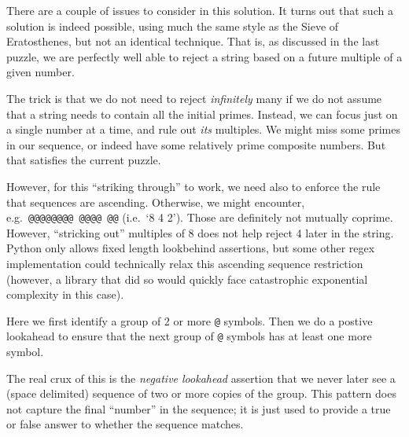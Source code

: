 \newpage

There are a couple of issues to consider in this solution. It turns out
that such a solution is indeed possible, using much the same style as
the Sieve of Eratosthenes, but not an identical technique. That is, as
discussed in the last puzzle, we are perfectly well able to reject a
string based on a future multiple of a given number.

The trick is that we do not need to reject \emph{infinitely} many if we
do not assume that a string needs to contain all the initial primes.
Instead, we can focus just on a single number at a time, and rule out
\emph{its} multiples. We might miss some primes in our sequence, or
indeed have some relatively prime composite numbers. But that satisfies
the current puzzle.

However, for this ``striking through'' to work, we need also to enforce
the rule that sequences are ascending. Otherwise, we might encounter,
e.g.~\texttt{@@@@@@@@\ @@@@\ @@} (i.e.~`8 4 2'). Those are definitely
not mutually coprime. However, ``stricking out'' multiples of 8 does not
help reject 4 later in the string. Python only allows fixed length
lookbehind assertions, but some other regex implementation could
technically relax this ascending sequence restriction (however, a
library that did so would quickly face catastrophic exponential
complexity in this case).

\begin{Shaded}
\begin{Highlighting}[]
\OperatorTok{=} 
\end{Highlighting}
\end{Shaded}

Here we first identify a group of 2 or more \texttt{@} symbols. Then we
do a postive lookahead to ensure that the next group of \texttt{@}
symbols has at least one more symbol.

The real crux of this is the \emph{negative lookahead} assertion that we
never later see a (space delimited) sequence of two or more copies of
the group. This pattern does not capture the final ``number'' in the
sequence; it is just used to provide a true or false answer to whether
the sequence matches.

\newpage
